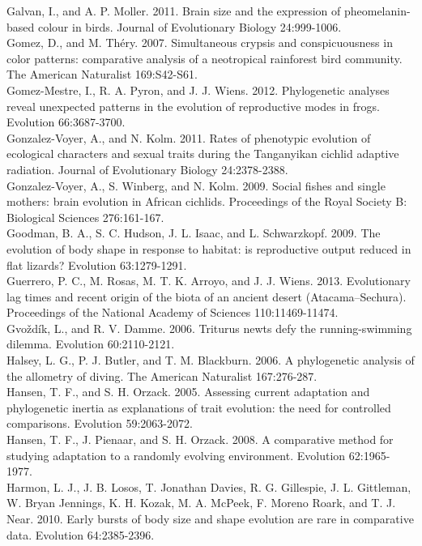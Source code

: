 Galvan, I., and A. P. Moller. 2011. Brain size and the expression of pheomelanin-based colour in birds. Journal of Evolutionary Biology 24:999-1006.\\
Gomez, D., and M. Th\'{e}ry. 2007. Simultaneous crypsis and conspicuousness in color patterns: comparative analysis of a neotropical rainforest bird community. The American Naturalist 169:S42-S61.\\
Gomez-Mestre, I., R. A. Pyron, and J. J. Wiens. 2012. Phylogenetic analyses reveal unexpected patterns in the evolution of reproductive modes in frogs. Evolution 66:3687-3700.\\
Gonzalez-Voyer, A., and N. Kolm. 2011. Rates of phenotypic evolution of ecological characters and sexual traits during the Tanganyikan cichlid adaptive radiation. Journal of Evolutionary Biology 24:2378-2388.\\
Gonzalez-Voyer, A., S. Winberg, and N. Kolm. 2009. Social fishes and single mothers: brain evolution in African cichlids. Proceedings of the Royal Society B: Biological Sciences 276:161-167.\\
Goodman, B. A., S. C. Hudson, J. L. Isaac, and L. Schwarzkopf. 2009. The evolution of body shape in response to habitat: is reproductive output reduced in flat lizards? Evolution 63:1279-1291.\\
Guerrero, P. C., M. Rosas, M. T. K. Arroyo, and J. J. Wiens. 2013. Evolutionary lag times and recent origin of the biota of an ancient desert (Atacama–Sechura). Proceedings of the National Academy of Sciences 110:11469-11474.\\
Gvo\v{z}d\'{i}k, L., and R. V. Damme. 2006. Triturus newts defy the running-swimming dilemma. Evolution 60:2110-2121.\\
Halsey, L. G., P. J. Butler, and T. M. Blackburn. 2006. A phylogenetic analysis of the allometry of diving. The American Naturalist 167:276-287.\\
Hansen, T. F., and S. H. Orzack. 2005. Assessing current adaptation and phylogenetic inertia as explanations of trait evolution: the need for controlled comparisons. Evolution 59:2063-2072.\\
Hansen, T. F., J. Pienaar, and S. H. Orzack. 2008. A comparative method for studying adaptation to a randomly evolving environment. Evolution 62:1965-1977.\\
Harmon, L. J., J. B. Losos, T. Jonathan Davies, R. G. Gillespie, J. L. Gittleman, W. Bryan Jennings, K. H. Kozak, M. A. McPeek, F. Moreno Roark, and T. J. Near. 2010. Early bursts of body size and shape evolution are rare in comparative data. Evolution 64:2385-2396.\\
